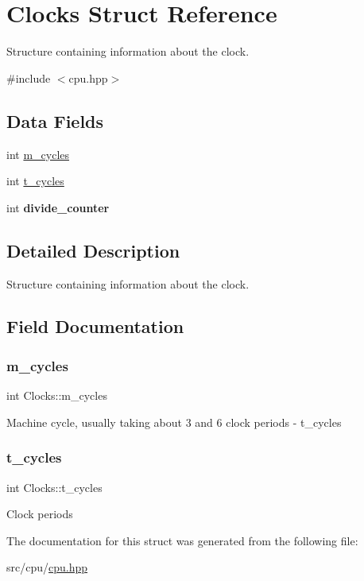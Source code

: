 \hypertarget{structClocks}{}\section{Clocks Struct Reference}
\label{structClocks}


Structure containing information about the clock.  




{\ttfamily \#include $<$cpu.\+hpp$>$}

\subsection*{Data Fields}
\begin{DoxyCompactItemize}
\item 
int \mbox{\hyperlink{structClocks_a154d63c216eca30ecbaea0b3a103b6eb}{m\+\_\+cycles}}
\item 
int \mbox{\hyperlink{structClocks_a0cdb6bcb6d6802d3b04162ea37b0cbfe}{t\+\_\+cycles}}
\item 
\mbox{\label{structClocks_aee9b586038cb14b0b2e795b200b59510}} 
int {\bfseries divide\+\_\+counter}
\end{DoxyCompactItemize}


\subsection{Detailed Description}
Structure containing information about the clock. 

\subsection{Field Documentation}
\mbox{\label{structClocks_a154d63c216eca30ecbaea0b3a103b6eb}} 
\subsubsection{\texorpdfstring{m\+\_\+cycles}{m\_cycles}}
{\footnotesize\ttfamily int Clocks\+::m\+\_\+cycles}

Machine cycle, usually taking about 3 and 6 clock periods -\/ t\+\_\+cycles \mbox{\label{structClocks_a0cdb6bcb6d6802d3b04162ea37b0cbfe}} 
\subsubsection{\texorpdfstring{t\+\_\+cycles}{t\_cycles}}
{\footnotesize\ttfamily int Clocks\+::t\+\_\+cycles}

Clock periods 

The documentation for this struct was generated from the following file\+:\begin{DoxyCompactItemize}
\item 
src/cpu/\mbox{\hyperlink{cpu_8hpp}{cpu.\+hpp}}\end{DoxyCompactItemize}
